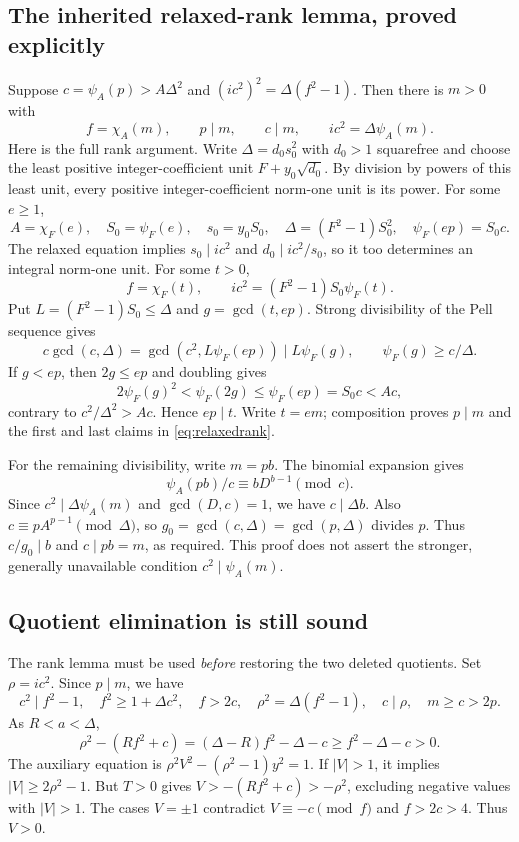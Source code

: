 \subsection{The inherited relaxed-rank lemma, proved explicitly}
Suppose $c=\psi_A(p)>A\Delta^2$ and
$(ic^2)^2=\Delta(f^2-1)$. Then there is $m>0$ with
\begin{equation}\label{eq:relaxedrank}
 f=\chi_A(m),\qquad p\mid m,\qquad c\mid m,\qquad
 ic^2=\Delta\psi_A(m).
\end{equation}
Here is the full rank argument. Write $\Delta=d_0s_0^2$ with $d_0>1$
squarefree and choose the least positive integer-coefficient unit
$F+y_0\sqrt{d_0}$. By division by powers of this least unit, every
positive integer-coefficient norm-one unit is its power. For some $e\ge1$,
\[
 A=\chi_F(e),\quad S_0=\psi_F(e),\quad s_0=y_0S_0,
 \quad\Delta=(F^2-1)S_0^2,\quad\psi_F(ep)=S_0c.
\]
The relaxed equation implies $s_0\mid ic^2$ and $d_0\mid ic^2/s_0$,
so it too determines an integral norm-one unit. For some $t>0$,
\[
 f=\chi_F(t),\qquad ic^2=(F^2-1)S_0\psi_F(t).
\]
Put $L=(F^2-1)S_0\le\Delta$ and $g=\gcd(t,ep)$. Strong divisibility
of the Pell sequence gives
\[
 c\gcd(c,\Delta)=\gcd(c^2,L\psi_F(ep))\mid L\psi_F(g),
 \qquad \psi_F(g)\ge c/\Delta.
\]
If $g<ep$, then $2g\le ep$ and doubling gives
\[
 2\psi_F(g)^2<\psi_F(2g)\le\psi_F(ep)=S_0c<Ac,
\]
contrary to $c^2/\Delta^2>Ac$. Hence $ep\mid t$. Write $t=em$;
composition proves $p\mid m$ and the first and last claims in
\eqref{eq:relaxedrank}.

For the remaining divisibility, write $m=pb$. The binomial expansion gives
\[
 \psi_A(pb)/c\equiv bD^{b-1}\pmod c.
\]
Since $c^2\mid\Delta\psi_A(m)$ and $\gcd(D,c)=1$, we have
$c\mid\Delta b$. Also
$c\equiv pA^{p-1}\pmod\Delta$, so
$g_0=\gcd(c,\Delta)=\gcd(p,\Delta)$ divides $p$.
Thus $c/g_0\mid b$ and $c\mid pb=m$, as required.
This proof does not assert the stronger, generally unavailable condition
$c^2\mid\psi_A(m)$.

\subsection{Quotient elimination is still sound}
The rank lemma must be used \emph{before} restoring the two deleted
quotients. Set $\rho=ic^2$. Since $p\mid m$, we have
\[
 c^2\mid f^2-1,\quad f^2\ge1+\Delta c^2,\quad f>2c,
 \quad\rho^2=\Delta(f^2-1),\quad c\mid\rho,\quad m\ge c>2p.
\]
As $R<a<\Delta$,
\[
 \rho^2-(Rf^2+c)=(\Delta-R)f^2-\Delta-c
 \ge f^2-\Delta-c>0.
\]
The auxiliary equation is
$\rho^2V^2-(\rho^2-1)y^2=1$. If $|V|>1$, it implies
$|V|\ge2\rho^2-1$. But $T>0$ gives $V>-(Rf^2+c)>-\rho^2$,
excluding negative values with $|V|>1$. The cases $V=\pm1$ contradict
$V\equiv-c\pmod f$ and $f>2c>4$. Thus $V>0$.

